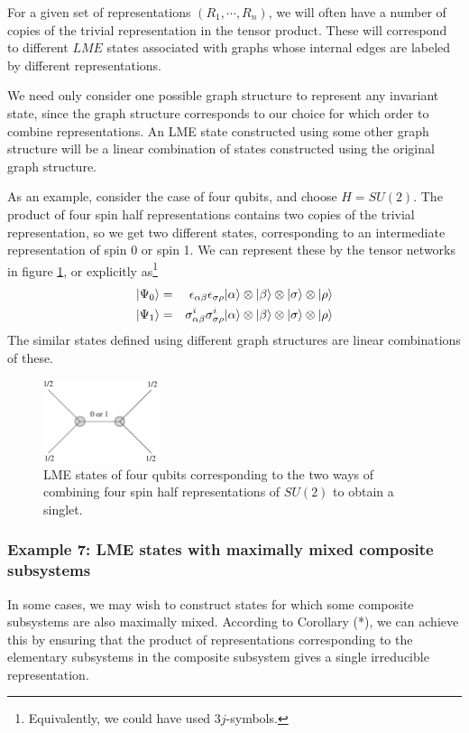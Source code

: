 \documentclass[12pt]{article}
\theoremstyle{definition}
\newcommand{\bea}{\begin{eqnarray}}
\newcommand{\eea}{\end{eqnarray}}
\begin{document}
For a given set of representations $(R_1, \cdots, R_n)$, we will often have a number of copies of the trivial representation in the tensor product. These will correspond to different $LME$ states associated with graphs whose internal edges are labeled by different representations.

We need only consider one possible graph structure to represent any invariant state, since the graph structure corresponds to our choice for which order to combine representations. An LME state constructed using some other graph structure will be a linear combination of states constructed using the original graph structure.

As an example, consider the case of four qubits, and choose $H = SU(2)$. The product of four spin half representations contains two copies of the trivial representation, so we get two different states, corresponding to an intermediate representation of spin 0 or spin 1. We can represent these by the tensor networks in figure \ref{qubit4simple}, or explicitly as\footnote{Equivalently, we could have used $3j$-symbols.}
\bea
|\Psi_0 \rangle &=& \epsilon_{\alpha \beta} \epsilon_{\sigma \rho} | \alpha \rangle \otimes |\beta \rangle \otimes |\sigma \rangle \otimes |\rho \rangle \cr
|\Psi_1 \rangle &=& \sigma^i_{\alpha \beta} \sigma^i_{\sigma \rho} | \alpha \rangle \otimes |\beta \rangle \otimes |\sigma \rangle \otimes |\rho \rangle
\eea
The similar states defined using different graph structures are linear combinations of these.

\begin{figure}
\centering
\includegraphics[width=0.3\textwidth]{qubit4simple.eps}
\caption{LME states of four qubits corresponding to the two ways of combining four spin half representations of $SU(2)$ to obtain a singlet.}
\label{qubit4simple}
\end{figure}


\subsubsection*{Example 7: LME states with maximally mixed composite subsystems}

In some cases, we may wish to construct states for which some composite subsystems are also maximally mixed. According to Corollary (*), we can achieve this by ensuring that the product of representations corresponding to the elementary subsystems in the composite subsystem gives a single irreducible representation.
\end{document}
